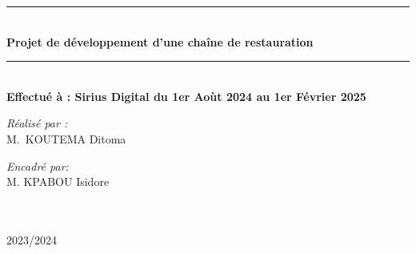 \begin{titlepage}
\begin{center}
		\rule{\linewidth}{0.3mm} \\[0.4cm]
		{ \huge \bfseries\color{blue!70!black} Projet de développement d'une chaîne de restauration \\[0.4cm] }
		\rule{\linewidth}{0.3mm} \\[1cm]

		{\large \bfseries Effectué à : {Sirius Digital} du  1er Aoùt 2024 au 1er Février 2025 }\\[1cm]
		\noindent
		\begin{minipage}{0.4\textwidth}
			\begin{flushleft} \large
				\emph{\color{black}Réalisé par :}\\
				M.~\textsc{KOUTEMA} Ditoma \\
			\end{flushleft}
		\end{minipage}%
		\begin{minipage}{0.5\textwidth}
			\begin{flushright} \large
				\emph{\color{black}Encadré par:} \\
				
				M. \textsc{KPABOU} Isidore \\
			\end{flushright}
		\end{minipage}\\[1cm]

	


		{\large \color{black}{Année universitaire}\\ \color{black}2023/2024}

	\end{center}
\end{titlepage}
